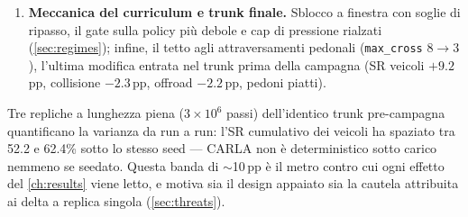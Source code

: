 \begin{enumerate}
        \texttt{safe\_to\_push}. La risoluzione promossa (V1) ha alzato
        la soglia del gate da 0.75 a 0.85, mantenendo attiva l'urgenza
        dei veicoli sotto hazard moderato; un retuning del passo dei
        pedoni nella direzione opposta (V3) è stato rigettato per una
        traiettoria dell'ultimo quartile in declino.
  \item \textbf{Meccanica del curriculum e trunk finale.} Sblocco a
        finestra con soglie di ripasso, il gate sulla policy più debole
        e cap di pressione rialzati (\cref{sec:regimes}); infine, il
        tetto agli attraversamenti pedonali (\texttt{max\_cross} $8 \to
        3$), l'ultima modifica entrata nel trunk prima della campagna
        (SR veicoli $+9.2$\,pp, collisione $-2.3$\,pp, offroad
        $-2.2$\,pp, pedoni piatti).
\end{enumerate}

Tre repliche a lunghezza piena ($3\times10^{6}$ passi) dell'identico
trunk pre-campagna quantificano la varianza da run a run: l'SR
cumulativo dei veicoli ha spaziato tra 52.2 e 62.4\% sotto lo stesso
seed --- CARLA non è deterministico sotto carico nemmeno se seedato.
Questa banda di $\sim$10\,pp è il metro contro cui ogni effetto del
\cref{ch:results} viene letto, e motiva sia il design appaiato sia la
cautela attribuita ai delta a replica singola (\cref{sec:threats}).

